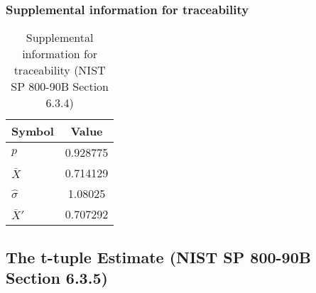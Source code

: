 \documentclass[a3paper,xelatex,english]{bxjsarticle}
\begin{document}
\subsubsection{Supplemental information for traceability}
\renewcommand{\arraystretch}{1.8}
\begin{table}[h]
\caption{Supplemental information for traceability (NIST SP 800-90B Section 6.3.4)}
\begin{center}
\begin{tabular}{|l|c|}
\hline 
\rowcolor{anotherlightblue} %
Symbol				& Value \\ \hline 
$p$				& 0.928775\\ \hline 
$\bar{X}$ 		& 0.714129\\ \hline
$\hat{\sigma}$		&  1.08025\\ \hline
$\bar{X}'$ 		& 0.707292\\ \hline
\end{tabular}
\end{center}
\end{table}
\renewcommand{\arraystretch}{1.4}
\clearpage
\subsection{The t-tuple Estimate (NIST SP 800-90B Section 6.3.5)}\label{sec:Binary635}
\end{document}
